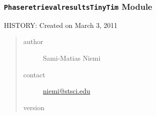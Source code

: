 \documentclass[letterpaper,10pt,english]{sphinxmanual}
\begin{document}
\begin{fulllineitems}
\label{SamPy.focus:SamPy.focus.HSTfocus.MirrorMovesInHSTTime}
\end{fulllineitems}



\subsubsection{\texttt{PhaseretrievalresultsTinyTim} Module}
\label{SamPy.focus:phaseretrievalresultstinytim-module}\label{SamPy.focus:module-SamPy.focus.PhaseretrievalresultsTinyTim}
HISTORY:
Created on March 3, 2011
\begin{quote}\begin{description}
\item[{author}] \leavevmode
Sami-Matias Niemi

\item[{contact}] \leavevmode
\href{mailto:niemi@stsci.edu}{niemi@stsci.edu}

\item[{version}] 

\end{description}\end{quote}

\end{document}
